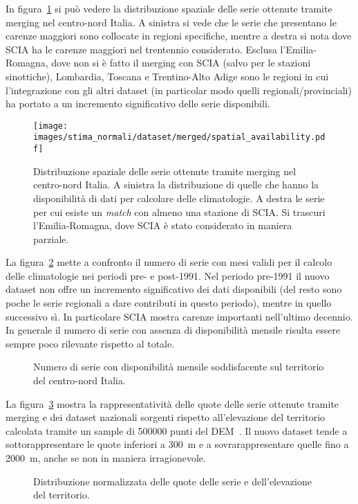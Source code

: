 In figura~\ref{fig:merged-series} si può vedere la distribuzione spaziale delle serie ottenute tramite merging nel centro-nord Italia. A sinistra si vede che le serie che presentano le carenze maggiori sono collocate in regioni specifiche, mentre a destra si nota dove SCIA ha le carenze maggiori nel trentennio considerato. Esclusa l'Emilia-Romagna, dove non si è fatto il merging con SCIA (salvo per le stazioni sinottiche), Lombardia, Toscana e Trentino-Alto Adige sono le regioni in cui l'integrazione con gli altri dataset (in particolar modo quelli regionali/provinciali) ha portato a un incremento significativo delle serie disponibili.
\begin{figure}[ht]
  \centering
  \texttt{[image: images/stima\_normali/dataset/merged/spatial\_availability.pdf]}
  \caption{Distribuzione spaziale delle serie ottenute tramite merging nel centro-nord Italia. A sinistra la distribuzione di quelle che hanno la disponibilità di dati per calcolare delle climatologie. A destra le serie per cui esiste un \emph{match} con almeno una stazione di SCIA. Si trascuri l'Emilia-Romagna, dove SCIA è stato considerato in maniera parziale.}\label{fig:merged-series}
\end{figure}

La figura~\ref{fig:merged-timeseries} mette a confronto il numero di serie con mesi validi per il calcolo delle climatologie nei periodi pre- e post-1991. Nel periodo pre-1991 il nuovo dataset non offre un incremento significativo dei dati disponibili (del resto sono poche le serie regionali a dare contributi in questo periodo), mentre in quello successivo sì. In particolare SCIA mostra carenze importanti nell'ultimo decennio. In generale il numero di serie con assenza di disponibilità mensile risulta essere sempre poco rilevante rispetto al totale.
\begin{figure}[ht]
  \centering
  
  \caption{Numero di serie con disponibilità mensile soddisfacente sul territorio del centro-nord Italia.}\label{fig:merged-timeseries}
\end{figure}

La figura~\ref{fig:merged-elevations} mostra la rappresentatività delle quote delle serie ottenute tramite merging e dei dataset nazionali sorgenti rispetto all'elevazione del territorio calcolata tramite un sample di \num{500000} punti del DEM~\cite{europeanspaceagencyCopernicusGlobalEuropean2022}. Il nuovo dataset tende a sottorappresentare le quote inferiori a \qty{300}{\meter} e a sovrarappresentare quelle fino a \qty{2000}{\meter}, anche se non in maniera irragionevole.
\begin{figure}[ht]
  \centering
  
  \caption{Distribuzione normalizzata delle quote delle serie e dell'elevazione del territorio.}\label{fig:merged-elevations}
\end{figure}

